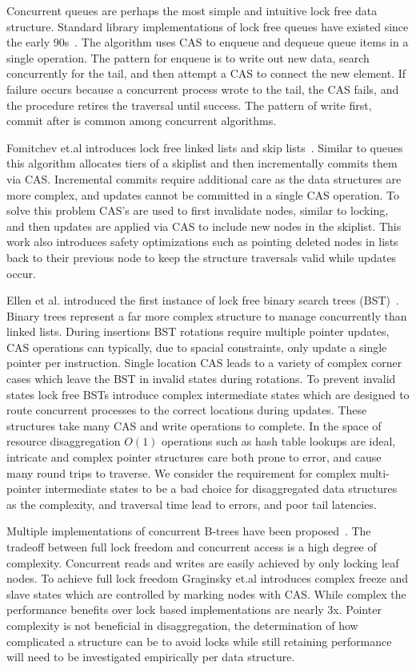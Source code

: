 Concurrent queues are perhaps the most simple and intuitive lock free data
structure. Standard library implementations of lock free queues have existed
since the early 90s~\cite{simple-fast}. The algorithm uses CAS to enqueue and
dequeue queue items in a single operation. The pattern for enqueue is to write
out new data, search concurrently for the tail, and then attempt a CAS to
connect the new element. If failure occurs because a concurrent process wrote to
the tail, the CAS fails, and the procedure retires the traversal until success.
The pattern of write first, commit after is common among concurrent algorithms.

Fomitchev et.al introduces lock free linked lists and skip
lists~\cite{lock-free-skip}. Similar to queues this algorithm allocates tiers of
a skiplist and then incrementally commits them via CAS. Incremental commits
require additional care as the data structures are more complex, and updates
cannot be committed in a single CAS operation. To solve this problem CAS's are
used to first invalidate nodes, similar to locking, and then updates are applied
via CAS to include new nodes in the skiplist. This work also introduces safety
optimizations such as pointing deleted nodes in lists back to their previous
node to keep the structure traversals valid while updates occur.

Ellen et al. introduced the first instance of lock free binary search trees
(BST)~\cite{non-block-binary}.  Binary trees represent a far more complex
structure to manage concurrently than linked lists. During insertions BST
rotations require multiple pointer updates, CAS operations can typically, due to
spacial constraints, only update a single pointer per instruction. Single
location CAS leads to a variety of complex corner cases which leave the BST in
invalid states during rotations.  To prevent invalid states lock free BSTs
introduce complex intermediate states which are designed to route concurrent
processes to the correct locations during updates. These structures take many
CAS and write operations to complete. In the space of resource disaggregation
$O(1)$ operations such as hash table lookups are ideal, intricate and complex
pointer structures care both prone to error, and cause many round trips to
traverse. We consider the requirement for complex multi-pointer intermediate
states to be a bad choice for disaggregated data structures as the complexity,
and traversal time lead to errors, and poor tail latencies.
 
Multiple implementations of concurrent B-trees have been
proposed~\cite{read-concur-btree,lock-free-btree}. The tradeoff between full
lock freedom and concurrent access is a high degree of complexity. Concurrent
reads and writes are easily achieved by only locking leaf nodes. To achieve full
lock freedom Graginsky et.al introduces complex freeze and slave states which
are controlled by marking nodes with CAS. While complex the performance benefits
over lock based implementations are nearly 3x. Pointer complexity is not
beneficial in disaggregation, the determination of how complicated a structure
can be to avoid locks while still retaining performance will need to be
investigated empirically per data structure.


